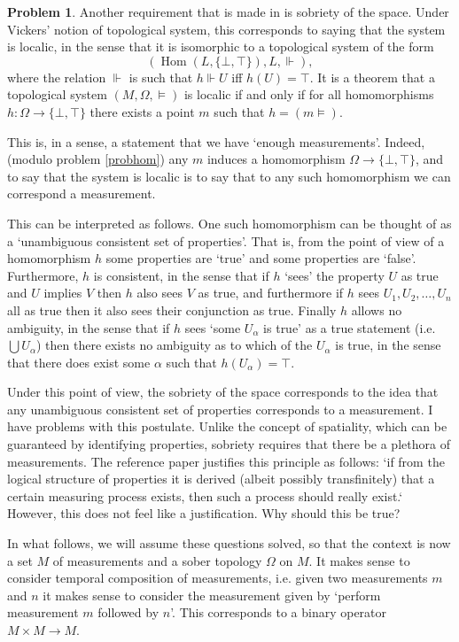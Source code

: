 \documentclass{article}
\theoremstyle{definition}
\newtheorem{problem}{Problem}
\theoremstyle{plain}
\DeclareMathOperator{\Hom}{Hom}
\begin{document}
\begin{problem}
Another requirement that is made in \cite{measurement} is sobriety of the space. Under Vickers' notion of topological system, this corresponds to saying that the system is localic, in the sense that it is isomorphic to a topological system of the form
\[(\Hom(L, \{\bot, \top\}), L, \Vdash),\]
where the relation $\Vdash$ is such that $h \Vdash U$ iff $h(U) = \top$. It is a theorem that a topological system $(M, \Omega, \vDash)$ is localic if and only if for all homomorphisms $h : \Omega \to \{\bot, \top\}$ there exists a point $m$ such that $h = (m \vDash)$.

This is, in a sense, a statement that we have `enough measurements'. Indeed, (modulo problem \ref{probhom}) any $m$ induces a homomorphism $\Omega \to \{\bot,\top\}$, and to say that the system is localic is to say that to any such homomorphism we can correspond a measurement.

This can be interpreted as follows. One such homomorphism can be thought of as a `unambiguous consistent set of properties'. That is, from the point of view of a homomorphism $h$ some properties are `true' and some properties are `false'. Furthermore, $h$ is consistent, in the sense that if $h$ `sees' the property $U$ as true and $U$ implies $V$ then $h$ also sees $V$ as true, and furthermore if $h$ sees $U_1, U_2, \dots, U_n$ all as true then it also sees their conjunction as true. Finally $h$ allows no ambiguity, in the sense that if $h$ sees `some $U_\alpha$ is true' as a true statement (i.e. $\bigcup U_\alpha$) then there exists no ambiguity as to which of the $U_\alpha$ is true, in the sense that there does exist some $\alpha$ such that $h(U_\alpha) = \top$.

Under this point of view, the sobriety of the space corresponds to the idea that any unambiguous consistent set of properties corresponds to a measurement. I have problems with this postulate. Unlike the concept of spatiality, which can be guaranteed by identifying properties, sobriety requires that there be a plethora of measurements. The reference paper \cite{measurement} justifies this principle as follows: `if from the logical structure of properties it is derived (albeit possibly transfinitely) that a certain measuring process exists, then such a process should really exist.` However, this does not feel like a justification. Why should this be true?
\end{problem}

In what follows, we will assume these questions solved, so that the context is now a set $M$ of measurements and a sober topology $\Omega$ on $M$. It makes sense to consider temporal composition of measurements, i.e. given two measurements $m$ and $n$ it makes sense to consider the measurement given by `perform measurement $m$ followed by $n$'. This corresponds to a binary operator $M \times M \to M$.
\end{document}
